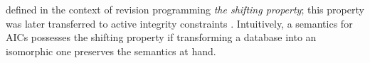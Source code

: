 




\citet{tcs/MarekT98} defined in the context of revision programming \emph{the shifting property}; this property was later transferred to active integrity constraints \cite{tplp/CaropreseT11}. 
Intuitively, a semantics for AICs possesses the shifting property if transforming a database into an isomorphic one preserves the semantics at hand. 

